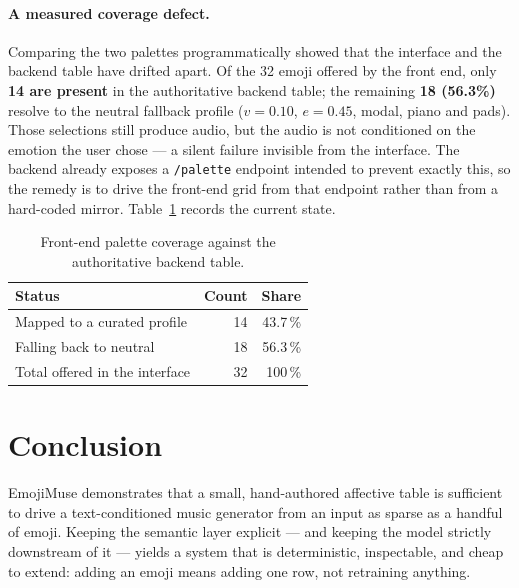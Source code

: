\documentclass[11pt]{article}
\begin{document}
\paragraph{A measured coverage defect.}
Comparing the two palettes programmatically showed that the interface and
the backend table have drifted apart. Of the 32 emoji offered by the front
end, only \textbf{14 are present} in the authoritative backend table; the
remaining \textbf{18 (56.3\%)} resolve to the neutral fallback profile
($v{=}0.10$, $e{=}0.45$, modal, piano and pads). Those selections still
produce audio, but the audio is not conditioned on the emotion the user
chose --- a silent failure invisible from the interface. The backend already
exposes a \texttt{/palette} endpoint intended to prevent exactly this, so the
remedy is to drive the front-end grid from that endpoint rather than from a
hard-coded mirror. Table~\ref{tab:coverage} records the current state.

\begin{table}[htbp]
\centering
\small
\caption{Front-end palette coverage against the authoritative backend table.}
\label{tab:coverage}
\begin{tabular}{@{}lrr@{}}
\toprule
\textbf{Status} & \textbf{Count} & \textbf{Share} \\
\midrule
Mapped to a curated profile & 14 & 43.7\,\% \\
Falling back to neutral     & 18 & 56.3\,\% \\
\midrule
Total offered in the interface & 32 & 100\,\% \\
\bottomrule
\end{tabular}
\end{table}

\FloatBarrier

\section{Conclusion}

EmojiMuse demonstrates that a small, hand-authored affective table is
sufficient to drive a text-conditioned music generator from an input as
sparse as a handful of emoji. Keeping the semantic layer explicit --- and
keeping the model strictly downstream of it --- yields a system that is
deterministic, inspectable, and cheap to extend: adding an emoji means adding
one row, not retraining anything.
\end{document}
